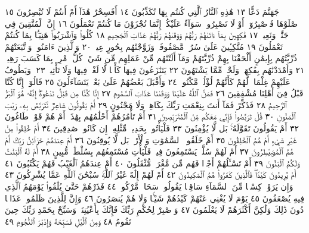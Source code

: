 جَهَنَّمَ دَعًّا ١٣ هَٰذِهِ ٱلنَّارُ ٱلَّتِي كُنتُم بِهَا تُكَذِّبُونَ ١٤
أَفَسِحْرٌ هَٰذَآ أَمْ أَنتُمْ لَا تُبْصِرُونَ ١٥ ٱصْلَوْهَا فَٱصْبِرُوٓا۟
أَوْ لَا تَصْبِرُوا۟ سَوَآءٌ عَلَيْكُمْۖ إِنَّمَا تُجْزَوْنَ مَا كُنتُمْ تَعْمَلُونَ ١٦
إِنَّ ٱلْمُتَّقِينَ فِي جَنَّٰتࣲ وَنَعِيمࣲ ١٧ فَٰكِهِينَ بِمَآ ءَاتَىٰهُمْ رَبُّهُمْ
وَوَقَىٰهُمْ رَبُّهُمْ عَذَابَ ٱلْجَحِيمِ ١٨ كُلُوا۟ وَٱشْرَبُوا۟ هَنِيٓـَٔۢا بِمَا
كُنتُمْ تَعْمَلُونَ ١٩ مُتَّكِـِٔينَ عَلَىٰ سُرُرࣲ مَّصْفُوفَةࣲۖ وَزَوَّجْنَٰهُم
بِحُورٍ عِينࣲ ٢٠ وَٱلَّذِينَ ءَامَنُوا۟ وَٱتَّبَعَتْهُمْ ذُرِّيَّتُهُم بِإِيمَٰنٍ أَلْحَقْنَا
بِهِمْ ذُرِّيَّتَهُمْ وَمَآ أَلَتْنَٰهُم مِّنْ عَمَلِهِم مِّن شَيْءࣲۚ كُلُّ ٱمْرِئِۭ بِمَا
كَسَبَ رَهِينࣱ ٢١ وَأَمْدَدْنَٰهُم بِفَٰكِهَةࣲ وَلَحْمࣲ مِّمَّا يَشْتَهُونَ ٢٢
يَتَنَٰزَعُونَ فِيهَا كَأْسࣰا لَّا لَغْوࣱ فِيهَا وَلَا تَأْثِيمࣱ ٢٣۞ وَيَطُوفُ عَلَيْهِمْ
غِلْمَانࣱ لَّهُمْ كَأَنَّهُمْ لُؤْلُؤࣱ مَّكْنُونࣱ ٢٤ وَأَقْبَلَ بَعْضُهُمْ عَلَىٰ
بَعْضࣲ يَتَسَآءَلُونَ ٢٥ قَالُوٓا۟ إِنَّا كُنَّا قَبْلُ فِيٓ أَهْلِنَا مُشْفِقِينَ ٢٦
فَمَنَّ ٱللَّهُ عَلَيْنَا وَوَقَىٰنَا عَذَابَ ٱلسَّمُومِ ٢٧ إِنَّا كُنَّا
مِن قَبْلُ نَدْعُوهُۖ إِنَّهُۥ هُوَ ٱلْبَرُّ ٱلرَّحِيمُ ٢٨ فَذَكِّرْ فَمَآ أَنتَ بِنِعْمَتِ
رَبِّكَ بِكَاهِنࣲ وَلَا مَجْنُونٍ ٢٩ أَمْ يَقُولُونَ شَاعِرࣱ نَّتَرَبَّصُ بِهِۦ رَيْبَ
ٱلْمَنُونِ ٣٠ قُلْ تَرَبَّصُوا۟ فَإِنِّي مَعَكُم مِّنَ ٱلْمُتَرَبِّصِينَ ٣١
أَمْ تَأْمُرُهُمْ أَحْلَٰمُهُم بِهَٰذَآۚ أَمْ هُمْ قَوْمࣱ طَاغُونَ ٣٢ أَمْ يَقُولُونَ
تَقَوَّلَهُۥۚ بَل لَّا يُؤْمِنُونَ ٣٣ فَلْيَأْتُوا۟ بِحَدِيثࣲ مِّثْلِهِۦٓ إِن كَانُوا۟
صَٰدِقِينَ ٣٤ أَمْ خُلِقُوا۟ مِنْ غَيْرِ شَيْءٍ أَمْ هُمُ ٱلْخَٰلِقُونَ ٣٥
أَمْ خَلَقُوا۟ ٱلسَّمَٰوَٰتِ وَٱلْأَرْضَۚ بَل لَّا يُوقِنُونَ ٣٦ أَمْ عِندَهُمْ
خَزَآئِنُ رَبِّكَ أَمْ هُمُ ٱلْمُصَۣيْطِرُونَ ٣٧ أَمْ لَهُمْ سُلَّمࣱ
يَسْتَمِعُونَ فِيهِۖ فَلْيَأْتِ مُسْتَمِعُهُم بِسُلْطَٰنࣲ مُّبِينٍ ٣٨
أَمْ لَهُ ٱلْبَنَٰتُ وَلَكُمُ ٱلْبَنُونَ ٣٩ أَمْ تَسْـَٔلُهُمْ أَجْرࣰا فَهُم مِّن مَّغْرَمࣲ
مُّثْقَلُونَ ٤٠ أَمْ عِندَهُمُ ٱلْغَيْبُ فَهُمْ يَكْتُبُونَ ٤١ أَمْ يُرِيدُونَ
كَيْدࣰاۖ فَٱلَّذِينَ كَفَرُوا۟ هُمُ ٱلْمَكِيدُونَ ٤٢ أَمْ لَهُمْ إِلَٰهٌ غَيْرُ ٱللَّهِۚ
سُبْحَٰنَ ٱللَّهِ عَمَّا يُشْرِكُونَ ٤٣ وَإِن يَرَوْا۟ كِسْفࣰا مِّنَ ٱلسَّمَآءِ سَاقِطࣰا
يَقُولُوا۟ سَحَابࣱ مَّرْكُومࣱ ٤٤ فَذَرْهُمْ حَتَّىٰ يُلَٰقُوا۟ يَوْمَهُمُ ٱلَّذِي فِيهِ
يُصْعَقُونَ ٤٥ يَوْمَ لَا يُغْنِي عَنْهُمْ كَيْدُهُمْ شَيْـࣰٔا وَلَا هُمْ يُنصَرُونَ ٤٦
وَإِنَّ لِلَّذِينَ ظَلَمُوا۟ عَذَابࣰا دُونَ ذَٰلِكَ وَلَٰكِنَّ أَكْثَرَهُمْ
لَا يَعْلَمُونَ ٤٧ وَٱصْبِرْ لِحُكْمِ رَبِّكَ فَإِنَّكَ بِأَعْيُنِنَاۖ وَسَبِّحْ بِحَمْدِ
رَبِّكَ حِينَ تَقُومُ ٤٨ وَمِنَ ٱلَّيْلِ فَسَبِّحْهُ وَإِدْبَٰرَ ٱلنُّجُومِ ٤٩
